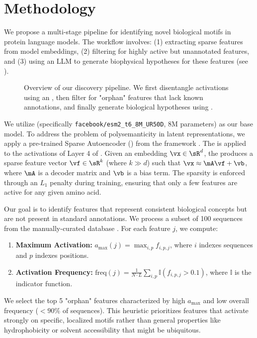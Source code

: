 \section{Methodology}
\label{sec:method}

We propose a multi-stage pipeline for identifying novel biological motifs in protein language models. The workflow involves: (1) extracting sparse features from model embeddings, (2) filtering for highly active but unannotated features, and (3) using an LLM to generate biophysical hypotheses for these features (see ).

\begin{figure}[h]
\centering
\caption{Overview of our discovery pipeline. We first disentangle \esm activations using an \sae, then filter for "orphan" features that lack known annotations, and finally generate biological hypotheses using \gpt.}
\label{sec:method:fig}
\label{fig:method}
\end{figure}

We utilize \esm (specifically \texttt{facebook/esm2\_t6\_8M\_UR50D}, 8M parameters) as our base model. To address the problem of polysemanticity in latent representations, we apply a pre-trained Sparse Autoencoder (\sae) from the \interplm framework \cite{simon2024interplm}. The \sae is applied to the activations of Layer 4 of \esm. Given an embedding $\vx \in \sR^{d}$, the \sae produces a sparse feature vector $\vf \in \sR^{k}$ (where $k \gg d$) such that $\vx \approx \mA\vf + \vb$, where $\mA$ is a decoder matrix and $\vb$ is a bias term. The sparsity is enforced through an $L_1$ penalty during training, ensuring that only a few features are active for any given amino acid.

Our goal is to identify features that represent consistent biological concepts but are not present in standard annotations. We process a subset of 100 sequences from the manually-curated \swissprot database \cite{uniprot2023uniprot}. For each feature $j$, we compute:
\begin{enumerate}
    \item {\bf Maximum Activation:} $a_{\text{max}}(j) = \max_{i, p} f_{i,p,j}$, where $i$ indexes sequences and $p$ indexes positions.
    \item {\bf Activation Frequency:} $\text{freq}(j) = \frac{1}{N \cdot L} \sum_{i,p} \mathbb{I}(f_{i,p,j} > 0.1)$, where $\mathbb{I}$ is the indicator function.
\end{enumerate}
We select the top 5 "orphan" features characterized by high $a_{\text{max}}$ and low overall frequency ($< 90\%$ of sequences). This heuristic prioritizes features that activate strongly on specific, localized motifs rather than general properties like hydrophobicity or solvent accessibility that might be ubiquitous.


